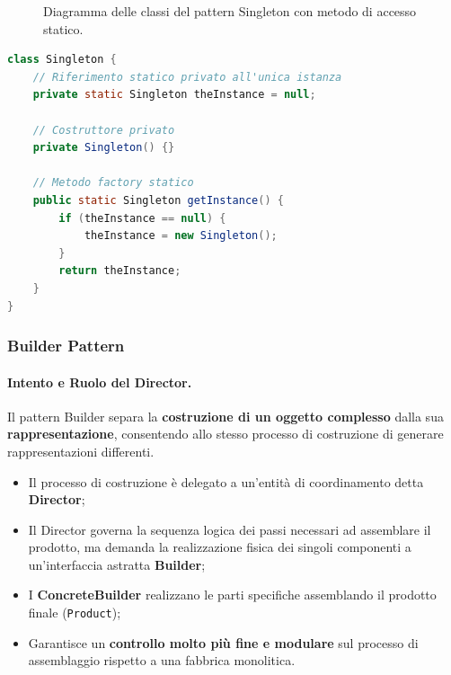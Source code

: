 \documentclass[12pt]{extarticle}
\newcommand{\cn}[1]{\makebox[\linewidth][c]{\textbf{#1}}}
\begin{document}
\begin{figure}[htbp]
\centering
{}
\caption{Diagramma delle classi del pattern Singleton con metodo di accesso statico.}
\label{fig:pattern_singleton_structure}
\end{figure}

\begin{lstlisting}[language=Java]
class Singleton {
    // Riferimento statico privato all'unica istanza
    private static Singleton theInstance = null;

    // Costruttore privato
    private Singleton() {}

    // Metodo factory statico
    public static Singleton getInstance() {
        if (theInstance == null) {
            theInstance = new Singleton();
        }
        return theInstance;
    }
}
\end{lstlisting}

\subsubsection{Builder Pattern}
\paragraph{Intento e Ruolo del Director.}
Il pattern Builder separa la \textbf{costruzione di un oggetto complesso} dalla sua \textbf{rappresentazione}, consentendo allo stesso processo di costruzione di generare rappresentazioni differenti.
\begin{itemize}
    \item Il processo di costruzione è delegato a un'entità di coordinamento detta \textbf{Director};
    \item Il Director governa la sequenza logica dei passi necessari ad assemblare il prodotto, ma demanda la realizzazione fisica dei singoli componenti a un'interfaccia astratta \textbf{Builder};
    \item I \textbf{ConcreteBuilder} realizzano le parti specifiche assemblando il prodotto finale (\texttt{Product});
    \item Garantisce un \textbf{controllo molto più fine e modulare} sul processo di assemblaggio rispetto a una fabbrica monolitica.
\end{itemize}
\end{document}
